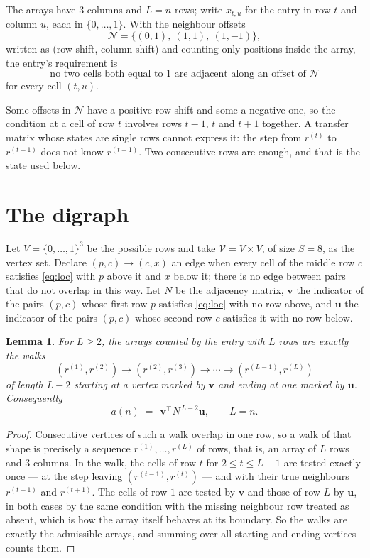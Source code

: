 \documentclass[11pt,a4paper]{article}
\theoremstyle{plain}
\newtheorem{lemma}[theorem]{Lemma}
\theoremstyle{definition}
\begin{document}
The arrays have $3$ columns and $L=n$ rows; write $x_{t,u}$ for the entry in
row $t$ and column $u$, each in $\{0,\dots,1\}$. With the neighbour offsets
\[
\mathcal N=\{(0,1),\ (1,1),\ (1,-1)\},
\]
written as (row shift, column shift) and counting only positions inside the array, the
entry's requirement is
\begin{equation}\label{eq:loc}
\text{no two cells both equal to }1\text{ are adjacent along an offset of }\mathcal N
\end{equation}
for every cell $(t,u)$.

Some offsets in $\mathcal N$ have a positive row shift and some a negative one, so the
condition at a cell of row $t$ involves rows $t-1$, $t$ and $t+1$ together. A transfer
matrix whose states are single rows cannot express it: the step from $r^{(t)}$ to
$r^{(t+1)}$ does not know $r^{(t-1)}$. Two consecutive rows are enough, and that is
the state used below.

\section{The digraph}

Let $V=\{0,\dots,1\}^{3}$ be the possible rows and take
$\mathcal V=V\times V$, of size $S=8$, as the vertex set. Declare $(p,c)\to(c,x)$ an edge
when every cell of the middle row $c$ satisfies \eqref{eq:loc} with $p$ above it and $x$
below it; there is no edge between pairs that do not overlap in this way. Let $N$ be the
adjacency matrix, $\mathbf{v}$ the indicator of the pairs $(p,c)$ whose first row $p$
satisfies \eqref{eq:loc} with no row above, and $\mathbf{u}$ the indicator of
the pairs $(p,c)$ whose second row $c$ satisfies it with no row below.

\begin{lemma}\label{lem:walk}
For $L\ge2$, the arrays counted by the entry with $L$ rows are exactly the walks
\[
(r^{(1)},r^{(2)})\to(r^{(2)},r^{(3)})\to\cdots\to(r^{(L-1)},r^{(L)})
\]
of length $L-2$ starting at a vertex marked by $\mathbf{v}$ and ending at one marked by
$\mathbf{u}$. Consequently
\[
a(n)\;=\;\,\mathbf{v}^{\!\top}N^{\,L-2}\mathbf{u},\qquad L=n .
\]
\end{lemma}

\begin{proof}
Consecutive vertices of such a walk overlap in one row, so a walk of that shape is
precisely a sequence $r^{(1)},\dots,r^{(L)}$ of rows, that is, an array of $L$ rows
and $3$ columns. In the walk, the cells of row $t$ for $2\le t\le L-1$ are tested
exactly once --- at the step leaving $(r^{(t-1)},r^{(t)})$ --- and with their true
neighbours $r^{(t-1)}$ and $r^{(t+1)}$. The cells of row $1$ are tested by
$\mathbf{v}$ and those of row $L$ by $\mathbf{u}$, in both cases by the same condition
with the missing neighbour row treated as absent, which is how the array itself behaves at
its boundary. So the walks are exactly the admissible arrays, and summing over all starting
and ending vertices counts them.
\end{proof}
\end{document}
